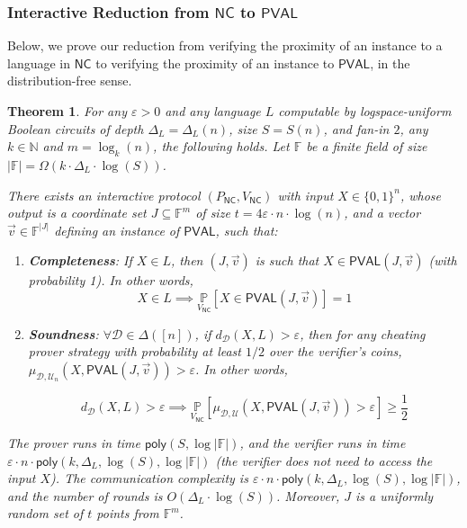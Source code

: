 \documentclass[11pt]{article}
\newtheorem{theorem}{Theorem}[section]
\newcommand{\poly}{\mathsf{poly}}
\newcommand{\NC}{\mathsf{NC}}
\newcommand{\PVAL}{\mathsf{PVAL}}
\newcommand{\F}{\mathbb{F}}
\newcommand{\N}{\mathbb{N}}
\newcommand{\sD}{\mathcal{D}}
\begin{document}
\subsubsection{Interactive Reduction from $\NC$ to $\PVAL$}
\label{sec:df_nc_to_pval}
Below, we prove our reduction from verifying the proximity of an instance to a language in $\NC$ to verifying the proximity of an instance to $\PVAL$, in the distribution-free sense.
\begin{theorem}
\label{thm:df_nc_pval_reduction}
For any $\varepsilon>0$ and any language $L$ computable by logspace-uniform Boolean circuits of depth $\Delta_{L} = \Delta_{L}(n)$, size $S = S(n)$, and fan-in $2$, any $k \in \N$ and $m = \log_{k}(n)$, the following holds. Let $\F$ be a finite field of size $|\F|= \Omega( k\cdot\Delta_{L}\cdot \log (S))$. 

There exists an interactive protocol $(P_{\NC},V_{\NC})$ with input $X \in \{0,1\}^n$, whose output is a coordinate set $J \subseteq \mathbb{F}^{m}$ of size $t = 4\varepsilon \cdot n \cdot \log (n)$, and a vector $\vec{v} \in \mathbb{F}^{\vert J\vert }$ defining an instance of $\PVAL$, such that:
\begin{enumerate}
    \item \textbf{Completeness}: If $X \in L$, then $(J,\vec{v})$ is such that $X \in \PVAL(J,\vec{v})$ (with probability 1). In other words,
    \begin{equation*}
        X\in L\implies \underset{{V_{\NC}}}{\mathbb{P}}[X\in \PVAL(J,\Vec{v})]=1
    \end{equation*}
    
    \item \textbf{Soundness}: $\forall \sD\in\Delta([n])$, if $d_{\mathcal{D}}(X,L)>\varepsilon$, then for any cheating prover strategy with probability at least $1/2$ over the verifier's coins, $\mu_{\mathcal{D}, \mathcal{U}_{n}}(X,\PVAL(J,\vec{v})) > \varepsilon$. In other words,

    \begin{equation*}
        d_{\sD}(X,L)>\varepsilon \implies \underset{{V_{\NC}}}{\mathbb{P}}[\mu_{\sD,\mathcal{U}}(X, \PVAL(J,\Vec{v}))>\varepsilon]\geq \frac{1}{2}
    \end{equation*}
    
\end{enumerate}

The prover runs in time $\poly(S, \log |\F|)$, and the verifier runs in time $\varepsilon \cdot n \cdot \poly(k,\Delta_{L},\log (S),\log |\F|)$ (the verifier does not need to access the input $X$). The communication complexity is $\varepsilon \cdot n \cdot \poly(k,\Delta_{L}, \log (S), \log |\F|)$, and the number of rounds is $O(\Delta_{L} \cdot \log (S))$. Moreover, $J$ is a uniformly random set of $t$ points from $\F^m$.
\end{theorem}
\end{document}
